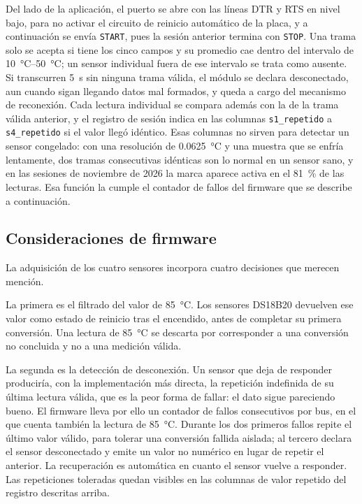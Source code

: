 Del lado de la aplicación, el puerto se abre con las líneas DTR y RTS
en nivel bajo, para no activar el circuito de reinicio automático de
la placa, y a continuación se envía \texttt{START}, pues la sesión
anterior termina con \texttt{STOP}. Una trama solo se acepta si tiene
los cinco campos y su promedio cae dentro del intervalo de
\SIrange{10}{50}{\celsius}; un sensor individual fuera de ese
intervalo se trata como ausente. Si transcurren \SI{5}{\second} sin
ninguna trama válida, el módulo se declara desconectado, aun cuando
sigan llegando datos mal formados, y queda a cargo del mecanismo de
reconexión. Cada lectura individual se compara además con la de la
trama válida anterior, y el registro de sesión indica en las columnas
\texttt{s1\_repetido} a \texttt{s4\_repetido} si el valor llegó
idéntico. Esas columnas no sirven para detectar un sensor congelado: con
una resolución de \SI{0.0625}{\celsius} y una muestra que se enfría
lentamente, dos tramas consecutivas idénticas son lo normal en un sensor
sano, y en las sesiones de noviembre de 2026 la marca aparece activa en
el \SI{81}{\percent} de las lecturas. Esa función la cumple el contador
de fallos del firmware que se describe a continuación.

\subsection*{Consideraciones de firmware}

La adquisición de los cuatro sensores incorpora cuatro decisiones que
merecen mención.

La primera es el filtrado del valor de \SI{85}{\celsius}. Los
sensores DS18B20 devuelven ese valor como estado de reinicio tras el
encendido, antes de completar su primera conversión. Una lectura de
\SI{85}{\celsius} se descarta por corresponder a una conversión no
concluida y no a una medición válida.

La segunda es la detección de desconexión. Un sensor que deja de
responder produciría, con la implementación más directa, la repetición
indefinida de su última lectura válida, que es la peor forma de fallar:
el dato sigue pareciendo bueno. El firmware lleva por ello un contador
de fallos consecutivos por bus, en el que cuenta también la lectura de
\SI{85}{\celsius}. Durante los dos primeros fallos repite el último
valor válido, para tolerar una conversión fallida aislada; al tercero
declara el sensor desconectado y emite un valor no numérico en lugar
de repetir el anterior. La recuperación es automática en cuanto el
sensor vuelve a responder. Las repeticiones toleradas quedan visibles
en las columnas de valor repetido del registro descritas arriba.

